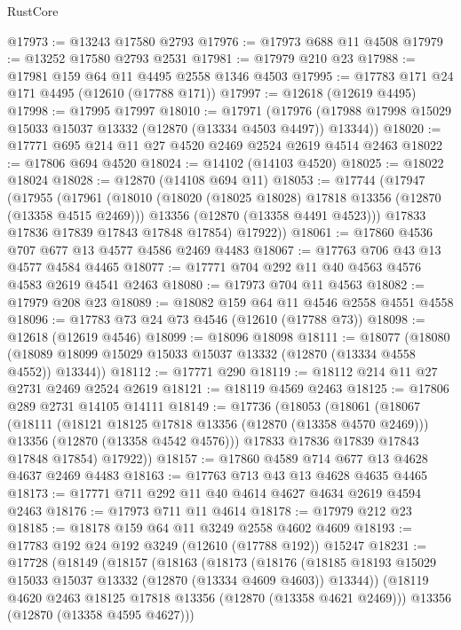 \begin{lexlean}{RustCore}
\begin{coremodule}
@17973 := @13243 @17580 @2793
@17976 := @17973 @688 @11 @4508
@17979 := @13252 @17580 @2793 @2531
@17981 := @17979 @210 @23
@17988 := @17981 @159 @64 @11 @4495 @2558 @1346 @4503
@17995 := @17783 @171 @24 @171 @4495 (@12610 (@17788 @171))
@17997 := @12618 (@12619 @4495)
@17998 := @17995 @17997
@18010 := @17971
    (@17976 (@17988 @17998 @15029 @15033 @15037 @13332 (@12870 (@13334 @4503 @4497)) @13344))
@18020 := @17771 @695 @214 @11 @27 @4520 @2469 @2524 @2619 @4514 @2463
@18022 := @17806 @694 @4520
@18024 := @14102 (@14103 @4520)
@18025 := @18022 @18024
@18028 := @12870 (@14108 @694 @11)
@18053 := @17744
    (@17947
      (@17955
        (@17961
          (@18010
            (@18020 (@18025 @18028) @17818 @13356 (@12870 (@13358 @4515 @2469)))
            @13356
            (@12870 (@13358 @4491 @4523)))
          @17833
          @17836
          @17839
          @17843
          @17848
          @17854)
        @17922))
@18061 := @17860 @4536 @707 @677 @13 @4577 @4586 @2469 @4483
@18067 := @17763 @706 @43 @13 @4577 @4584 @4465
@18077 := @17771 @704 @292 @11 @40 @4563 @4576 @4583 @2619 @4541 @2463
@18080 := @17973 @704 @11 @4563
@18082 := @17979 @208 @23
@18089 := @18082 @159 @64 @11 @4546 @2558 @4551 @4558
@18096 := @17783 @73 @24 @73 @4546 (@12610 (@17788 @73))
@18098 := @12618 (@12619 @4546)
@18099 := @18096 @18098
@18111 := @18077
    (@18080 (@18089 @18099 @15029 @15033 @15037 @13332 (@12870 (@13334 @4558 @4552)) @13344))
@18112 := @17771 @290
@18119 := @18112 @214 @11 @27 @2731 @2469 @2524 @2619
@18121 := @18119 @4569 @2463
@18125 := @17806 @289 @2731 @14105 @14111
@18149 := @17736
    (@18053
      (@18061
        (@18067
          (@18111
            (@18121 @18125 @17818 @13356 (@12870 (@13358 @4570 @2469)))
            @13356
            (@12870 (@13358 @4542 @4576)))
          @17833
          @17836
          @17839
          @17843
          @17848
          @17854)
        @17922))
@18157 := @17860 @4589 @714 @677 @13 @4628 @4637 @2469 @4483
@18163 := @17763 @713 @43 @13 @4628 @4635 @4465
@18173 := @17771 @711 @292 @11 @40 @4614 @4627 @4634 @2619 @4594 @2463
@18176 := @17973 @711 @11 @4614
@18178 := @17979 @212 @23
@18185 := @18178 @159 @64 @11 @3249 @2558 @4602 @4609
@18193 := @17783 @192 @24 @192 @3249 (@12610 (@17788 @192)) @15247
@18231 := @17728
    (@18149
      (@18157
        (@18163
          (@18173
            (@18176
              (@18185 @18193 @15029 @15033 @15037 @13332 (@12870 (@13334 @4609 @4603)) @13344))
            (@18119 @4620 @2463 @18125 @17818 @13356 (@12870 (@13358 @4621 @2469)))
            @13356
            (@12870 (@13358 @4595 @4627)))

\end{coremodule}
\end{lexlean}
